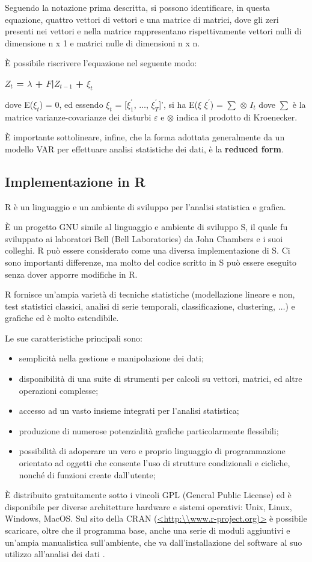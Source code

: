\documentclass[12pt,a4paper,twoside,openright]{book}
\begin{document}
Seguendo la notazione prima descritta, si possono identificare, in questa equazione, quattro vettori di vettori e una matrice di matrici, dove gli zeri presenti nei vettori e nella matrice rappresentano rispettivamente vettori nulli di dimensione n x 1 e matrici nulle di dimensioni n x n. 

È possibile riscrivere l'equazione nel seguente modo: 
\begin{center}
{\bfseries
$Z_t$ = $\lambda$ + $F$|$Z_{t-1}$ + $\xi_t$
}
\end{center}
dove E($\xi_t$) = 0, ed essendo $\xi_t$ = [$\xi^{'}_1$, $\dots$, $\xi^{'}_T$]', si ha E($\xi$ $\xi^{'}$) = $\sum$ $\otimes$ $I_t$ dove $\sum$ è la matrice varianze-covarianze dei disturbi $\varepsilon$ e $\otimes$ indica il prodotto di Kroenecker.
\medskip

È importante sottolineare, infine, che la forma adottata generalmente da un modello VAR per effettuare analisi statistiche dei dati, è la {\bfseries reduced form}.
\newpage
\subsection{Implementazione in R}
R è un linguaggio e un ambiente di sviluppo per l'analisi statistica e grafica.

È un progetto GNU simile al linguaggio e ambiente di sviluppo S, il quale fu sviluppato ai laboratori Bell (Bell Laboratories) da John Chambers e i suoi colleghi. R può essere considerato come una diversa implementazione di S. Ci sono importanti differenze, ma molto del codice scritto in S può essere eseguito senza dover apporre modifiche in R. 

R fornisce un'ampia varietà di tecniche statistiche (modellazione lineare e non, test statistici classici, analisi di serie temporali, classificazione, clustering, $\dots$) e grafiche ed è molto estendibile. 

Le sue caratteristiche principali sono:
\begin{itemize}
\item semplicità nella gestione e manipolazione dei dati;
\item disponibilità di una suite di strumenti per calcoli su vettori, matrici, ed altre operazioni complesse;
\item accesso ad un vasto insieme integrati per l'analisi statistica;
\item produzione di numerose potenzialità grafiche particolarmente flessibili;
\item possibilità di adoperare un vero e proprio linguaggio di programmazione orientato ad oggetti che consente l'uso di strutture condizionali e cicliche, nonché di funzioni create dall'utente;
\end{itemize}
È distribuito gratuitamente sotto i vincoli GPL (General Public License) ed è disponibile per diverse architetture hardware e sistemi operativi: Unix, Linux, Windows, MacOS. Sul sito della  CRAN (\url{<http:\\www.r-project.org)>} è possibile scaricare, oltre che il programma base, anche una serie di moduli aggiuntivi e un'ampia manualistica sull'ambiente, che va dall'installazione del software al suo utilizzo all'analisi dei dati \cite{12a}.
\end{document}
